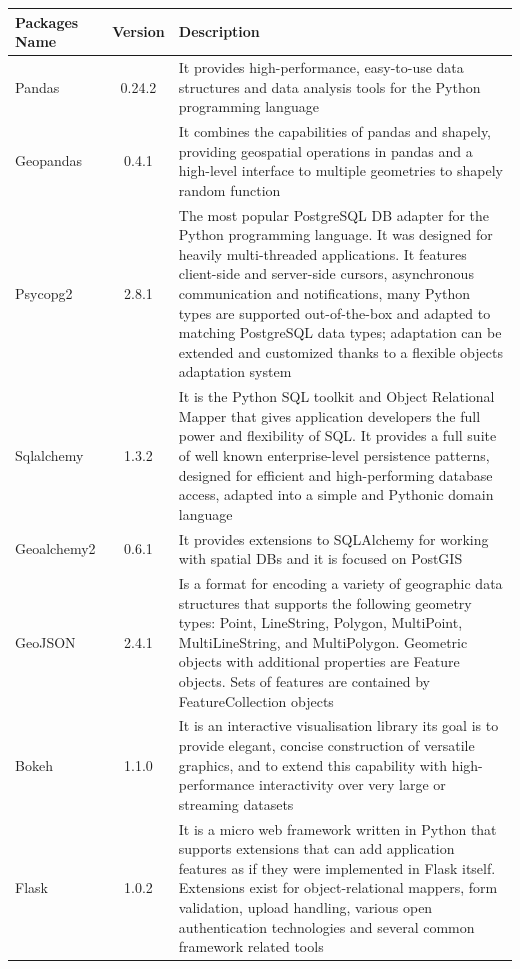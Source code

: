 \documentclass{article}
\begin{document}
\begin{longtable}[H]{|p{}|c|p{}|}
    \hline
    Packages Name & Version & Description \\    
    \hline
      Pandas  & 0.24.2    &   It provides high-performance, easy-to-use data structures and data analysis tools for the Python programming language
                \\
    \hline
      Geopandas & 0.4.1 &     It combines the capabilities of pandas and shapely, providing geospatial operations in pandas and a high-level interface to multiple geometries to shapely random function 
             \\
    \hline 
    Psycopg2 & 2.8.1 & The most popular PostgreSQL DB adapter for the Python programming language. It was designed for heavily multi-threaded applications. It features client-side and server-side cursors, asynchronous communication and notifications, many Python types are supported out-of-the-box and adapted to matching  PostgreSQL data types; adaptation can be extended and customized thanks to a flexible objects adaptation system
               \\
    \hline
    Sqlalchemy & 1.3.2 & It is the Python SQL toolkit and Object Relational Mapper that gives application developers the full power and flexibility of SQL. It provides a full suite of well known enterprise-level persistence patterns, designed for efficient and high-performing database access, adapted into a simple and Pythonic domain language
       \\
    \hline
    Geoalchemy2 & 0.6.1 & It provides extensions to SQLAlchemy for working with spatial DBs and it is focused on PostGIS
      \\
    \hline
    GeoJSON & 2.4.1 & Is a format for encoding a variety of geographic data structures that supports the following geometry types: Point, LineString, Polygon, MultiPoint, MultiLineString, and MultiPolygon. Geometric objects with additional properties are Feature objects. Sets of features are contained by FeatureCollection objects
       \\
    \hline
    Bokeh & 1.1.0 &  It is an interactive visualisation library its goal is to provide elegant, concise construction of versatile graphics, and to extend this capability with high-performance interactivity over very large or streaming datasets
        \\
    \hline
    Flask & 1.0.2 & It is a micro web framework written in Python that supports extensions that can add application features as if they were implemented in Flask itself. Extensions exist for object-relational mappers, form validation, upload handling, various open authentication technologies and several common framework related tools \\

\end{longtable}
\end{document}
